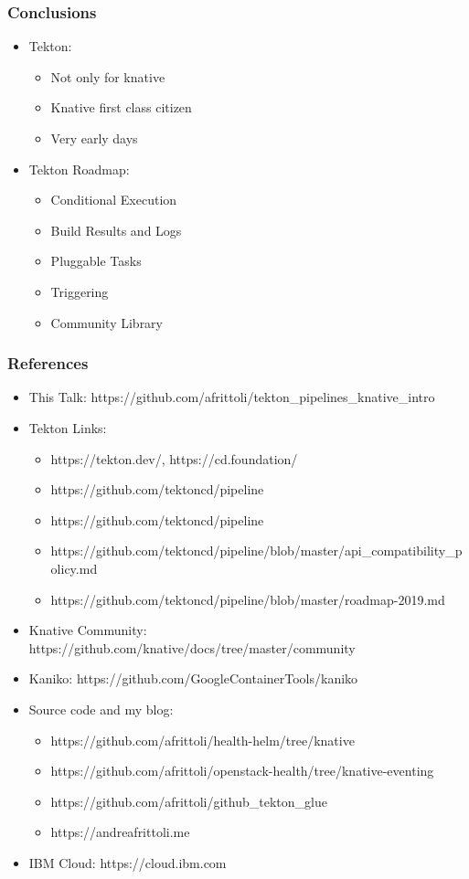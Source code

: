 \documentclass[aspectratio=169,11pt,hyperref={colorlinks=true}]{beamer}
\begin{document}
\begin{lblackrwhiteframe}
\begin{lblackrwhiteframe}
\begin{blackframe}
\begin{grayframe}
  \frametitle{Conclusions}
  \begin{itemize}
    \item Tekton:
    \begin{itemize}
      \item Not only for knative
      \item Knative first class citizen
      \item Very early days
    \end{itemize}
    \item Tekton Roadmap:
    \begin{itemize}
      \item Conditional Execution
      \item Build Results and Logs
      \item Pluggable Tasks
      \item Triggering
      \item Community Library
    \end{itemize}
  \end{itemize}
\end{grayframe}

\begin{grayframe}
  \frametitle{References}
  \begin{itemize}
    \item This Talk: https://github.com/afrittoli/tekton\_pipelines\_knative\_intro
    \item Tekton Links:
    \begin{itemize}
      \item https://tekton.dev/, https://cd.foundation/
      \item https://github.com/tektoncd/pipeline
      \item https://github.com/tektoncd/pipeline
      \item https://github.com/tektoncd/pipeline/blob/master/api\_compatibility\_policy.md
      \item https://github.com/tektoncd/pipeline/blob/master/roadmap-2019.md
    \end{itemize}
    \item Knative Community: https://github.com/knative/docs/tree/master/community
    \item Kaniko: https://github.com/GoogleContainerTools/kaniko
    \item Source code and my blog:
    \begin{itemize}
      \item https://github.com/afrittoli/health-helm/tree/knative
      \item https://github.com/afrittoli/openstack-health/tree/knative-eventing
      \item https://github.com/afrittoli/github\_tekton\_glue
      \item https://andreafrittoli.me
    \end{itemize}
    \item IBM Cloud: https://cloud.ibm.com
  \end{itemize}
\end{grayframe}


\end{blackframe}
\end{lblackrwhiteframe}
\end{lblackrwhiteframe}
\end{document}
